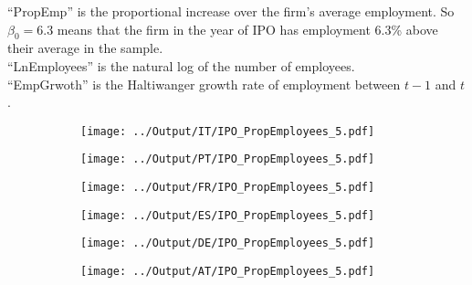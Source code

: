\documentclass[12pt,notitlepage]{article}
\begin{document}
\begin{table}[!htpb]
\caption{IPO Regressions}
    \begin{center}

    \end{center}
        ``PropEmp'' is the proportional increase over the firm's average employment. So $\beta_0=$6.3 means that the firm in the year of IPO has employment 6.3\% above their average in the sample.\\
    ``LnEmployees'' is the natural log of the number of employees. \\
    ``EmpGrwoth'' is the Haltiwanger growth rate of employment between $t-1$ and $t$. 
\end{table}





\begin{figure}[!htpb]
\centering
\caption{Employment Growth Over IPOs}
\begin{subfigure}{.49\textwidth}
    \centering
 \texttt{[image: ../Output/IT/IPO\_PropEmployees\_5.pdf]}
\end{subfigure}%
\begin{subfigure}{.49\textwidth}
    \centering
 \texttt{[image: ../Output/PT/IPO\_PropEmployees\_5.pdf]}
\end{subfigure}
\begin{subfigure}{.49\textwidth}
    \centering
 \texttt{[image: ../Output/FR/IPO\_PropEmployees\_5.pdf]}
\end{subfigure}%
\begin{subfigure}{.49\textwidth}
    \centering
 \texttt{[image: ../Output/ES/IPO\_PropEmployees\_5.pdf]}
\end{subfigure}
\begin{subfigure}{.49\textwidth}
    \centering
 \texttt{[image: ../Output/DE/IPO\_PropEmployees\_5.pdf]}
\end{subfigure}
\begin{subfigure}{.49\textwidth}
    \centering
 \texttt{[image: ../Output/AT/IPO\_PropEmployees\_5.pdf]}
\end{subfigure}
\end{figure}
\end{document}
